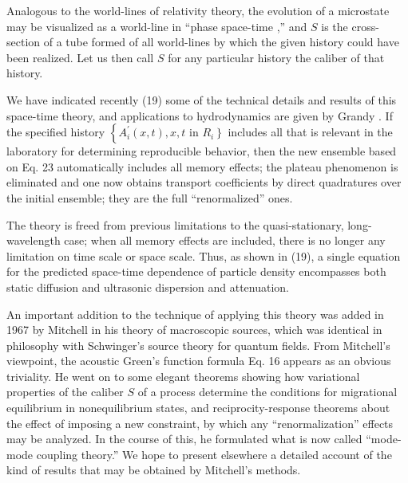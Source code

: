 \documentclass{article}
\begin{document}
Analogous to the world-lines of relativity theory, the evolution of a microstate may be visualized as a world-line in ``phase space-time ,'' and $S$ is the cross-section of a tube formed of all world-lines by which the given history could have been realized. Let us then call $S$ for any particular history the caliber of that history.

We have indicated recently (19) some of the technical details and results of this space-time theory, and applications to hydrodynamics are given by Grandy \cite{grandy1980}. If the specified history $\left\{A_i^{\prime}(x, t), x, t\right.$ in $\left.R_i\right\}$ includes all that is relevant in the laboratory for determining reproducible behavior, then the new ensemble based on Eq. 23 automatically includes all memory effects; the plateau phenomenon is eliminated and one now obtains transport coefficients by direct quadratures over the initial ensemble; they are the full ``renormalized'' ones.

The theory is freed from previous limitations to the quasi-stationary, long-wavelength case; when all memory effects are included, there is no longer any limitation on time scale or space scale. Thus, as shown in (19), a single equation for the predicted space-time dependence of particle density encompasses both static diffusion and ultrasonic dispersion and attenuation.

An important addition to the technique of applying this theory was added in 1967 by Mitchell \cite{mitchell1967} in his theory of macroscopic sources, which was identical in philosophy with Schwinger's source theory for quantum fields. From Mitchell's viewpoint, the acoustic Green's function formula Eq. 16 appears as an obvious triviality. He went on to some elegant theorems showing how variational properties of the caliber $S$ of a process determine the conditions for migrational equilibrium in nonequilibrium states, and reciprocity-response theorems about the effect of imposing a new constraint, by which any ``renormalization'' effects may be analyzed. In the course of this, he formulated what is now called ``mode-mode coupling theory.'' We hope to present elsewhere a detailed account of the kind of results that may be obtained by Mitchell's methods.
\end{document}
